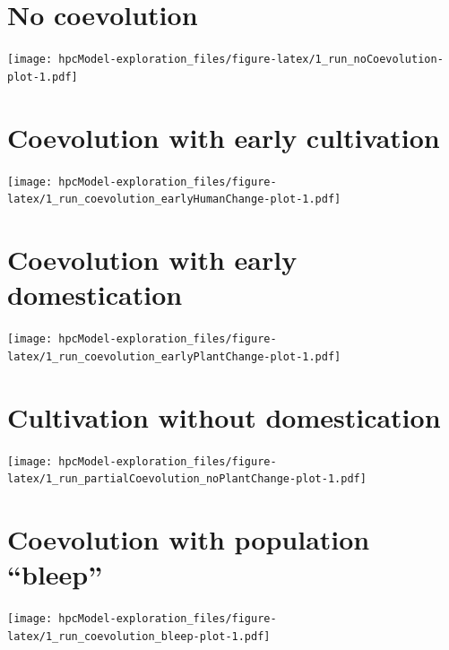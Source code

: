 \documentclass[
]{book}
\begin{document}
\newpage

\FloatBarrier
\newpage

\hypertarget{no-coevolution}{%
\section{No coevolution}\label{no-coevolution}}

\texttt{[image: hpcModel-exploration\_files/figure-latex/1\_run\_noCoevolution-plot-1.pdf]}

\newpage

\hypertarget{coevolution-with-early-cultivation}{%
\section{Coevolution with early cultivation}\label{coevolution-with-early-cultivation}}

\texttt{[image: hpcModel-exploration\_files/figure-latex/1\_run\_coevolution\_earlyHumanChange-plot-1.pdf]}

\newpage

\hypertarget{coevolution-with-early-domestication}{%
\section{Coevolution with early domestication}\label{coevolution-with-early-domestication}}

\texttt{[image: hpcModel-exploration\_files/figure-latex/1\_run\_coevolution\_earlyPlantChange-plot-1.pdf]}

\newpage

\hypertarget{cultivation-without-domestication}{%
\section{Cultivation without domestication}\label{cultivation-without-domestication}}

\texttt{[image: hpcModel-exploration\_files/figure-latex/1\_run\_partialCoevolution\_noPlantChange-plot-1.pdf]}

\newpage

\hypertarget{coevolution-with-population-bleep}{%
\section{Coevolution with population ``bleep''}\label{coevolution-with-population-bleep}}

\texttt{[image: hpcModel-exploration\_files/figure-latex/1\_run\_coevolution\_bleep-plot-1.pdf]}
\end{document}

